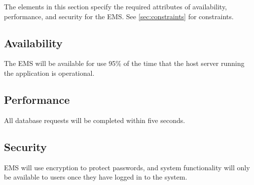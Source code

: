 
The elements in this section specify the required attributes
 of availability, performance, and security for the EMS.  See \autoref{sec:constraints} for constraints.

\subsection{Availability} 

The EMS will be available for use 95\% of the time that the host server running the application is operational.

\subsection{Performance} 

All database requests will be completed within five seconds.

\subsection{Security} 

EMS will use encryption to protect passwords, and system functionality will only be available to users once they have logged in to the system.

%
